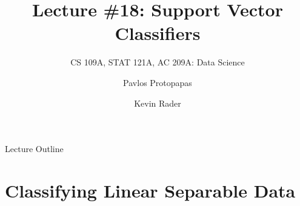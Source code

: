 \documentclass[12pt,t]{beamer}
\begin{document}

\title{\large{Lecture \#18: Support Vector Classifiers}}
\subtitle{CS 109A, STAT 121A, AC 209A: Data Science}
\author{Pavlos Protopapas \and Kevin Rader}
\date{}
{
\frame{
  \titlepage
  
}
}


\begin{frame}{Lecture Outline}
\tableofcontents
\end{frame}



\section{Classifying Linear Separable Data}
\end{document}
